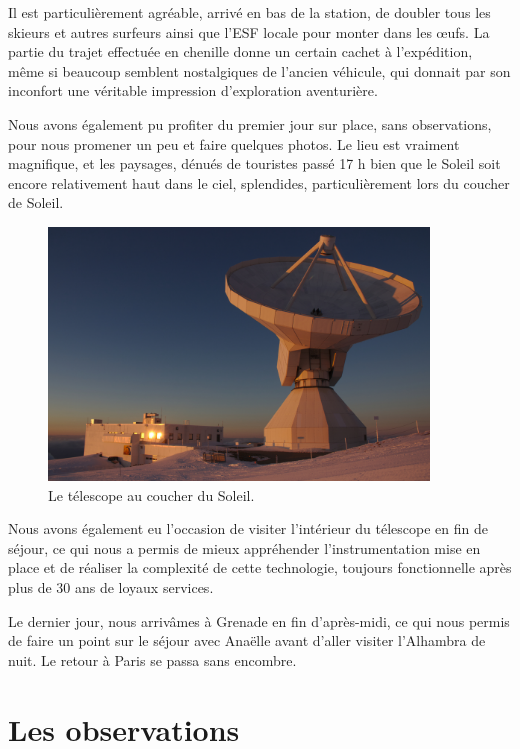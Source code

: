 \documentclass[a4paper,10pt,french]{article}
\begin{document}
Il est particulièrement agréable, arrivé en bas de la station, de doubler tous
les skieurs et autres surfeurs ainsi que l’ESF locale pour monter dans les
œufs. La partie du trajet effectuée en chenille donne un certain cachet à
l’expédition, même si beaucoup semblent nostalgiques de l’ancien véhicule, qui
donnait par son inconfort une véritable impression d’exploration aventurière.

Nous avons également pu profiter du premier jour sur place, sans observations,
pour nous promener un peu et faire quelques photos. Le lieu est vraiment
magnifique, et les paysages, dénués de touristes passé 17 h bien que le Soleil
soit encore relativement haut dans le ciel, splendides, particulièrement lors
du coucher de Soleil.

\begin{figure}[ht]
    \centering
    \includegraphics[width=0.9\textwidth]{30m.jpg}
    \caption{Le télescope au coucher du Soleil.}
\end{figure}

Nous avons également eu l’occasion de visiter l’intérieur du télescope en fin
de séjour, ce qui nous a permis de mieux appréhender l’instrumentation mise en
place et de réaliser la complexité de cette technologie, toujours fonctionnelle
après plus de 30 ans de loyaux services.

Le dernier jour, nous arrivâmes à Grenade en fin d’après-midi, ce qui nous
permis de faire un point sur le séjour avec Anaëlle avant d’aller visiter
l’Alhambra de nuit. Le retour à Paris se passa sans encombre.

\section{Les observations}
\end{document}
